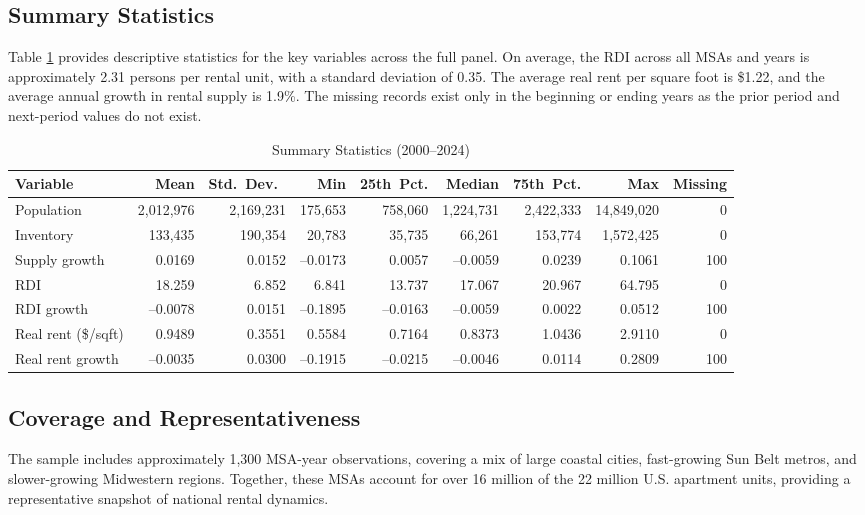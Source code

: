 \documentclass[APA,Times1COL]{WileyNJDv5} %
\begin{document}
\subsection{Summary Statistics}
Table \ref{tab:summary_stats} provides descriptive statistics for the key variables across the full panel. On average, the RDI across all MSAs and years is approximately 2.31 persons per rental unit, with a standard deviation of 0.35. The average real rent per square foot is \$1.22, and the average annual growth in rental supply is 1.9\%. The missing records exist only in the beginning or ending years as the prior period and next-period values do not exist. 

\begin{table}[hbt!]
	\centering
	\caption{Summary Statistics (2000--2024)}\label{tab:summary_stats}
	\begin{tabular}{lrrrrrrrr}
	\toprule
	Variable & Mean       & Std.\ Dev.\   & Min       & 25th Pct.  & Median     & 75th Pct.  & Max        & Missing \\
	\midrule
	Population          & 2,012,976  & 2,169,231  &   175,653  &   758,060  & 1,224,731  & 2,422,333  & 14,849,020 &   0  \\
	Inventory           &   133,435  &   190,354  &    20,783  &    35,735  &    66,261  &   153,774  &  1,572,425 &   0  \\
	Supply growth       &      0.0169&      0.0152&     –0.0173&     0.0057 &    –0.0059 &     0.0239 &     0.1061 & 100  \\
	RDI                 &     18.259 &      6.852 &      6.841 &    13.737  &    17.067  &    20.967  &    64.795  &   0  \\
	RDI growth          &     –0.0078&      0.0151&     –0.1895&    –0.0163 &    –0.0059 &     0.0022 &     0.0512 & 100  \\
	Real rent (\$/sqft) &      0.9489&      0.3551 &      0.5584&     0.7164 &     0.8373 &     1.0436 &     2.9110 &   0  \\
	Real rent growth    &     –0.0035&      0.0300 &     –0.1915&    –0.0215 &    –0.0046 &     0.0114 &     0.2809 & 100  \\
	\bottomrule
\end{tabular}
\end{table}

\subsection{Coverage and Representativeness}
The sample includes approximately 1,300 MSA-year observations, covering a mix of large coastal cities, fast-growing Sun Belt metros, and slower-growing Midwestern regions. Together, these MSAs account for over 16 million of the 22 million U.S. apartment units, providing a representative snapshot of national rental dynamics. 
\end{document}
